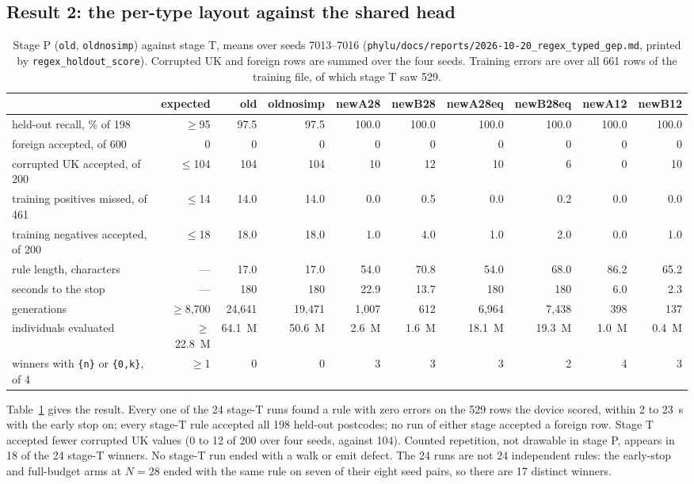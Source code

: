 \documentclass[sigconf,nonacm]{acmart}
\newcommand{\rx}{\lstinline[style=mono]}
\newcommand{\src}[1]{{\small\nolinkurl{#1}}}
\begin{document}
\subsection{Result 2: the per-type layout against the shared head}

\begin{table}[t]
\caption{Stage P (\texttt{old}, \texttt{oldnosimp}) against stage T, means over
seeds 7013--7016 (\src{phylu/docs/reports/2026-10-20_regex_typed_gep.md},
printed by \src{regex_holdout_score}). Corrupted UK and foreign rows are
summed over the four seeds. Training errors are over all 661 rows of the training
file, of which stage T saw 529.}
\label{tab:r2}
\small
\begin{tabular}{@{}lrrrrrrrrr@{}}
\toprule
 & expected & old & oldnosimp & newA28 & newB28 & newA28eq & newB28eq & newA12 & newB12 \\
\midrule
held-out recall, \% of 198 & $\ge$95 & 97.5 & 97.5 & 100.0 & 100.0 & 100.0 & 100.0 & 100.0 & 100.0 \\
foreign accepted, of 600 & 0 & 0 & 0 & 0 & 0 & 0 & 0 & 0 & 0 \\
corrupted UK accepted, of 200 & $\le$104 & 104 & 104 & 10 & 12 & 10 & 6 & 0 & 10 \\
training positives missed, of 461 & $\le$14 & 14.0 & 14.0 & 0.0 & 0.5 & 0.0 & 0.2 & 0.0 & 0.0 \\
training negatives accepted, of 200 & $\le$18 & 18.0 & 18.0 & 1.0 & 4.0 & 1.0 & 2.0 & 0.0 & 1.0 \\
rule length, characters & --- & 17.0 & 17.0 & 54.0 & 70.8 & 54.0 & 68.0 & 86.2 & 65.2 \\
seconds to the stop & --- & 180 & 180 & 22.9 & 13.7 & 180 & 180 & 6.0 & 2.3 \\
generations & $\ge$8{,}700 & 24{,}641 & 19{,}471 & 1{,}007 & 612 & 6{,}964 & 7{,}438 & 398 & 137 \\
individuals evaluated & $\ge$22.8~M & 64.1~M & 50.6~M & 2.6~M & 1.6~M & 18.1~M & 19.3~M & 1.0~M & 0.4~M \\
winners with \rx!{n}! or \rx!{0,k}!, of 4 & $\ge$1 & 0 & 0 & 3 & 3 & 3 & 2 & 4 & 3 \\
\bottomrule
\end{tabular}
\end{table}

Table~\ref{tab:r2} gives the result. Every one of the 24 stage-T runs found a rule
with zero errors on the 529 rows the device scored, within 2 to 23~s with the
early stop on; every stage-T rule accepted all 198 held-out postcodes; no run of
either stage accepted a foreign row. Stage T accepted fewer corrupted UK values
(0 to 12 of 200 over four seeds, against 104). Counted repetition, not drawable in
stage P, appears in 18 of the 24 stage-T winners. No stage-T run ended with a walk
or emit defect. The 24 runs are not 24 independent rules: the early-stop and
full-budget arms at $N=28$ ended with the same rule on seven of their eight
seed pairs, so there are 17 distinct winners.
\end{document}

